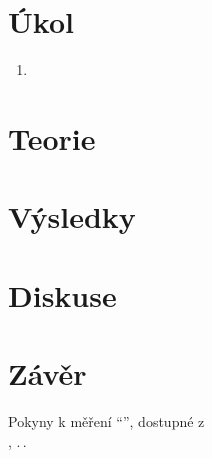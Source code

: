 \documentclass{protokol}
\begin{document}
  \section*{Úkol}

    \begin{enumerate}
      \item 
    \end{enumerate}

  \section*{Teorie}

    
  \section*{Výsledky}


  \section*{Diskuse}


  \section*{Závěr}


  \begin{thebibliography}{}
 
    Pokyny k měření ``'', dostupné z\\ \url{}, .\,.\,
   
  \end{thebibliography}
\end{document}
